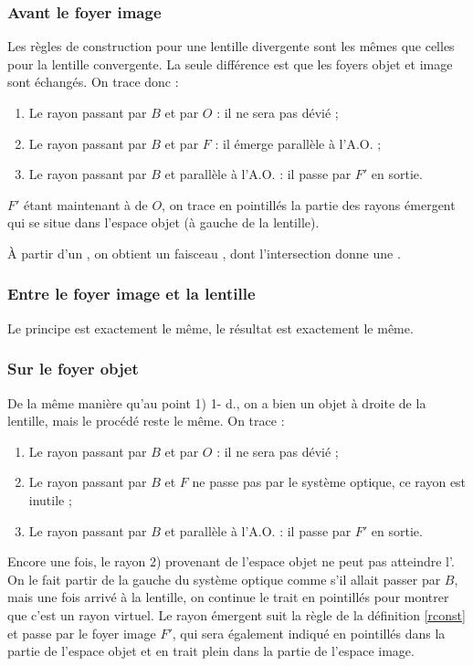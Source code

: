 \documentclass[10pt,a5paper,notitlepage]{book}
\begin{document}
\subsubsection{Avant le foyer image}
Les règles de construction pour une lentille divergente sont les mêmes que
celles pour la lentille convergente. La seule différence est que les foyers
objet et image sont échangés. On trace donc :

\begin{enumerate}
    \item Le rayon passant par $B$ et par $O$ : il ne sera pas dévié ;
    \item Le rayon passant par $B$ et par $F$ : il émerge parallèle à l'A.O. ;
    \item Le rayon passant par $B$ et parallèle à l'A.O. : il passe par $F'$ en
        sortie.
\end{enumerate}

$F'$ étant maintenant à  de $O$, on trace en pointillés la partie des
rayons émergent qui se situe dans l'espace objet (à gauche de la lentille).
\bigbreak

À partir d'un , on obtient un faisceau , dont
l'intersection donne une .

\subsubsection{Entre le foyer image et la lentille}
Le principe est exactement le même, le résultat est exactement le même.

\subsubsection{Sur le foyer objet}
De la même manière qu'au point \textcolor{capri}{1) 1- d.}, on a bien un objet à
droite de la lentille, mais le procédé reste le même. On trace :

\begin{enumerate}
    \item Le rayon passant par $B$ et par $O$ : il ne sera pas dévié ;
    \item Le rayon passant par $B$ et $F$ ne passe pas par le système optique,
        ce rayon est inutile ;
    \item Le rayon passant par $B$ et parallèle à l'A.O. : il passe par $F'$ en
        sortie.
\end{enumerate}

Encore une fois, le rayon \textcolor{brandeisblue}{2)} provenant de l'espace
objet ne peut pas atteindre l'. On le fait partir de la gauche
du système optique comme s'il allait passer par $B$, mais une fois arrivé à la
lentille, on continue le trait en pointillés pour montrer que c'est un rayon
virtuel. Le rayon émergent suit la règle de la définition \ref{rconst} et passe
par le foyer image $F'$, qui sera également indiqué en pointillés dans la partie
de l'espace objet et en trait plein dans la partie de l'espace image. \bigbreak
\end{document}
